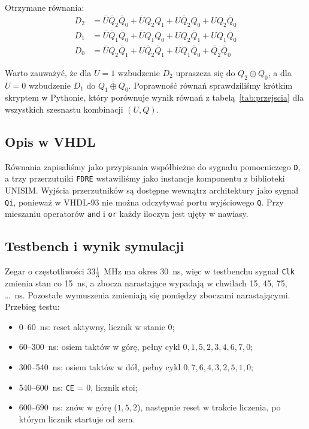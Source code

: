 \documentclass[11pt,a4paper]{article}
\newcommand{\nq}[1]{\overline{Q}_{#1}}
\newcommand{\nU}{\overline{U}}
\begin{document}
Otrzymane równania:
\begin{align*}
D_2 &= \nU\nq{2}\nq{0} + \nU Q_2 Q_1 + U\nq{2}Q_0 + U Q_2\nq{0}\\
D_1 &= \nU\nq{1}\nq{0} + \nU Q_1 Q_0 + U Q_2\nq{1} + U Q_1\nq{0}\\
D_0 &= \nU Q_2\nq{1} + U\nq{2}\nq{1} + U Q_1\nq{0} + \nq{2}\nq{0}
\end{align*}

Warto zauważyć, że dla $U = 1$ wzbudzenie $D_2$ upraszcza się do $Q_2 \oplus Q_0$, a dla $U = 0$ wzbudzenie $D_1$ do $\overline{Q_1 \oplus Q_0}$. Poprawność równań sprawdziliśmy krótkim skryptem w Pythonie, który porównuje wynik równań z tabelą~\ref{tab:przejscia} dla wszystkich szesnastu kombinacji $(U, Q)$.

\subsection{Opis w VHDL}

Równania zapisaliśmy jako przypisania współbieżne do sygnału pomocniczego \texttt{D}, a trzy przerzutniki \texttt{FDRE} wstawiliśmy jako instancje komponentu z biblioteki UNISIM. Wyjścia przerzutników są dostępne wewnątrz architektury jako sygnał \texttt{Qi}, ponieważ w VHDL-93 nie można odczytywać portu wyjściowego \texttt{Q}. Przy mieszaniu operatorów \texttt{and} i \texttt{or} każdy iloczyn jest ujęty w nawiasy.



\subsection{Testbench i wynik symulacji}

Zegar o częstotliwości $33\tfrac{1}{3}$~MHz ma okres 30~ns, więc w testbenchu sygnał \texttt{Clk} zmienia stan co 15~ns, a zbocza narastające wypadają w chwilach 15, 45, 75, \dots~ns. Pozostałe wymuszenia zmieniają się pomiędzy zboczami narastającymi. Przebieg testu:
\begin{itemize}[itemsep=0pt]
  \item 0--60~ns: reset aktywny, licznik w stanie 0;
  \item 60--300~ns: osiem taktów w górę, pełny cykl $0, 1, 5, 2, 3, 4, 6, 7, 0$;
  \item 300--540~ns: osiem taktów w dół, pełny cykl $0, 7, 6, 4, 3, 2, 5, 1, 0$;
  \item 540--600~ns: \texttt{CE} = 0, licznik stoi;
  \item 600--690~ns: znów w górę ($1, 5, 2$), następnie reset w trakcie liczenia, po którym licznik startuje od zera.
\end{itemize}
\end{document}
